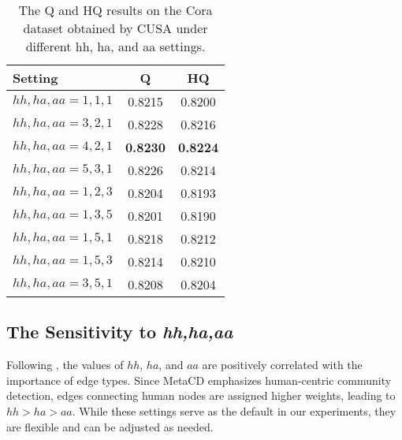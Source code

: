 \begingroup
\renewcommand{\arraystretch}{1}
\begin{table}[t]
\centering
\caption{Basic statistics of benchmark datasets.}
\label{dataset statistics}
\end{table}
\endgroup

\begin{table}[t]
\centering
\caption{The Q and HQ results on the Cora dataset obtained by CUSA under different hh, ha, and aa settings.}
\label{hh, ha, and aa settings}
\LARGE
\begin{tabular}{lcc}
\toprule
Setting & Q & HQ \\
\midrule
$hh,ha,aa=1,1,1$ & 0.8215 & 0.8200 \\
$hh,ha,aa=3,2,1$ & 0.8228 & 0.8216 \\
$hh,ha,aa=4,2,1$ & \textbf{0.8230} & \textbf{0.8224} \\
$hh,ha,aa=5,3,1$ & 0.8226 & 0.8214 \\
$hh,ha,aa=1,2,3$ & 0.8204 & 0.8193 \\
$hh,ha,aa=1,3,5$ & 0.8201 & 0.8190 \\
$hh,ha,aa=1,5,1$ & 0.8218 & 0.8212 \\
$hh,ha,aa=1,5,3$ & 0.8214 & 0.8210 \\
$hh,ha,aa=3,5,1$ & 0.8208 & 0.8204 \\
\bottomrule
\end{tabular}
\end{table}



\subsection{The Sensitivity to \textit{hh,ha,aa}}
\label{Sensitivity to hh, ha, aa}
Following \cite{zhang2022new}\cite{de2021centrality}, the values of $hh$, $ha$, and $aa$ are positively correlated with the importance of edge types. Since MetaCD emphasizes human-centric community detection, edges connecting human nodes are assigned higher weights, leading to $hh > ha > aa$. While these settings serve as the default in our experiments, they are flexible and can be adjusted as needed.

